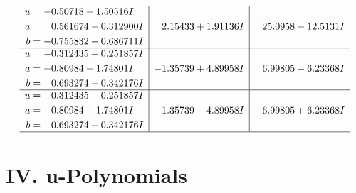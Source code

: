 \documentclass[1p]{elsarticle_modified}
\theoremstyle{definition}
\begin{document}
$$\begin{array}{c|c|c}
\begin{aligned}
u &= -0.50718 - 1.50516 I \\
a &= \phantom{-}0.561674 - 0.312900 I \\
b &= -0.755832 - 0.686711 I\end{aligned}
 & \phantom{-}2.15433 + 1.91136 I & \phantom{-}25.0958 - 12.5131 I \\ \hline\begin{aligned}
u &= -0.312435 + 0.251857 I \\
a &= -0.80984 - 1.74801 I \\
b &= \phantom{-}0.693274 + 0.342176 I\end{aligned}
 & -1.35739 + 4.89958 I & \phantom{-}6.99805 - 6.23368 I \\ \hline\begin{aligned}
u &= -0.312435 - 0.251857 I \\
a &= -0.80984 + 1.74801 I \\
b &= \phantom{-}0.693274 - 0.342176 I\end{aligned}
 & -1.35739 - 4.89958 I & \phantom{-}6.99805 + 6.23368 I\\
 \hline 
 \end{array}$$\newpage
\newpage\renewcommand{\arraystretch}{1}
\centering \section*{ IV. u-Polynomials}
\end{document}
